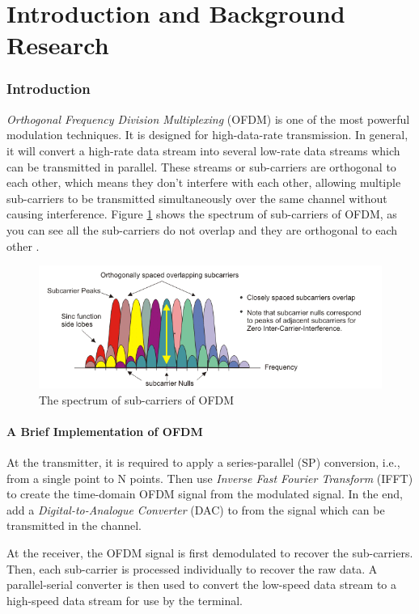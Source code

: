 \documentclass[11pt]{article}
\numberwithin{figure}{section}
\numberwithin{equation}{section}
\begin{document}
\part{Introduction and Background Research}

\pagestyle{plain}
\setcounter{page}{1}

\section{Introduction}
\textit{Orthogonal Frequency Division Multiplexing} (OFDM) is one of the most powerful modulation techniques. It is designed for high-data-rate transmission. In general, it will convert a high-rate data stream into several low-rate data streams which can be transmitted in parallel\cite{RN79}. These streams or sub-carriers are orthogonal to each other, which means they don't interfere with each other, allowing multiple sub-carriers to be transmitted simultaneously over the same channel without causing interference. Figure \ref{fig:subcarriers} shows the spectrum of sub-carriers of OFDM, as you can see all the sub-carriers do not overlap and they are orthogonal to each other \cite{RN80}.
\begin{figure}[!ht]
    \centering
    \includegraphics[width=1\textwidth]{images/subcarriers1.png}
    \caption{\label{fig:subcarriers}The spectrum of sub-carriers of OFDM}
\end{figure}
\subsection{A Brief Implementation of OFDM}
At the transmitter, it is required to apply a series-parallel (SP) conversion, i.e., from a single point to N points. Then use \textit{Inverse Fast Fourier Transform} (IFFT) to create the time-domain OFDM signal from the modulated signal. In the end, add a \textit{Digital-to-Analogue Converter} (DAC) to from the signal which can be transmitted in the channel.

At the receiver, the OFDM signal is first demodulated to recover the sub-carriers. Then, each sub-carrier is processed individually to recover the raw data. A parallel-serial converter is then used to convert the low-speed data stream to a high-speed data stream for use by the terminal.
\end{document}
